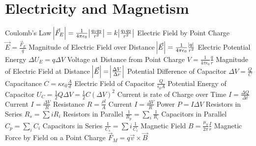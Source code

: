 \documentclass[11pt]{article}
\begin{document}
    \section{Electricity and Magnetism}
    Coulomb's Law $\abs{\vec{F}_{E}} = \frac{1}{4\pi \epsilon_{0}}\abs{\frac{q_{1}q_{2}}{r^{2}}} = k\abs{\frac{q_{1}q_{2}}{r^{2}}}$\newline
    Electric Field by Point Charge $\vec{E} = \frac{\vec{F}_{E}}{q}$\newline
    Magnitude of Electric Field over Distance $\abs{\vec{E}} = \frac{1}{4\pi \epsilon_{0}}\frac{\abs{q}}{r^{2}}$\newline
    Electric Potential Energy $\Delta U_{E} = q\Delta{V}$\newline
    Voltage at Distance from Point Charge $V = \frac{1}{4\pi \epsilon_{0}}\frac{q}{r}$\newline
    Magnitude of Electric Field at Distance $\abs{\vec{E}} = \abs{\frac{\Delta V}{\Delta r}}$\newline
    Potential Difference of Capacitor $\Delta V = \frac{Q}{C}$\newline
    Capacitance $C = \kappa \epsilon_{0} \frac{A}{d}$\newline
    Electric Field of Capacitor $\frac{Q}{\epsilon_{0}A}$\newline
    Potential Energy of Capacitor $U_{C} = \frac{1}{2}Q\Delta V = \frac{1}{2}C(\Delta V)^{2}$\newline
    Current is rate of Charge over Time $I = \frac{\Delta Q}{\Delta t}$\newline
    Current $I = \frac{\Delta V}{R}$\newline
    Resistance $R = \frac{\rho l}{A}$\newline
    Current $I = \frac{\Delta V}{R}$\newline
    Power $P = I\Delta V$\newline
    Resistors in Series $R_{s} = \sum{i}{}R_{i}$\newline
    Resistors in Parallel $\frac{1}{R_{p}} = \sum_{i}^{}\frac{1}{R_{i}}$\newline
    Capacitors in Parallel $C_{p} = \sum_{i}^{}C_{i}$\newline
    Capacitors in Series $\frac{1}{C_{s}} = \sum{i}^{}\frac{1}{C_{i}}$\newline
    Magnetic Field $B = \frac{\mu_0}{2\pi}\frac{I}{r}$\newline
    Magnetic Force by Field on a Point Charge $\vec{F}_{M} = q\vec{v} \times \vec{B}$\newline
\end{document}
